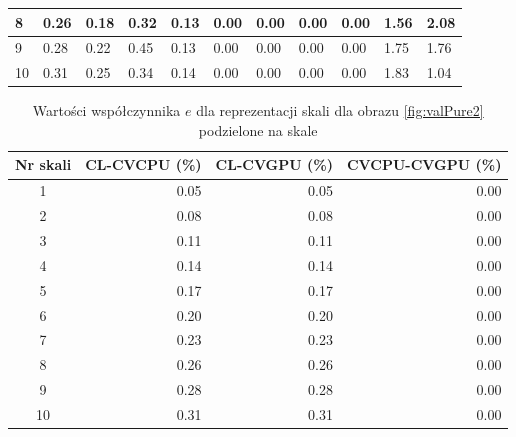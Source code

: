 {\begin{landscape}
\begin{table}[h]
\begin{tabular}{|p{0.8cm}|p{2cm}|p{2cm}|p{2cm}|p{2cm}|p{2cm}|p{2cm}|p{2cm}|p{2cm}|p{2cm}|p{2cm}|}
8        & 0.26                          & 0.18                           & 0.32              & 0.13             & 0.00                & 0.00                 & 0.00                  & 0.00                   & 1.56              & 2.08             \\ \hline
9        & 0.28                          & 0.22                           & 0.45              & 0.13             & 0.00                & 0.00                 & 0.00                  & 0.00                   & 1.75              & 1.76             \\ \hline
10       & 0.31                          & 0.25                           & 0.34              & 0.14             & 0.00                & 0.00                 & 0.00                  & 0.00                   & 1.83              & 1.04             \\ \hline
\end{tabular}
\end{table}
\end{landscape}}

\begin{center}
\begin{table}
\centering
\caption{Wartości współczynnika $ e $ dla reprezentacji skali dla obrazu \ref{fig:valPure2} podzielone na skale}
\label{tab:imageScaleRep2}
\begin{tabular}{|c|r|r|r|}
 \hline
Nr skali & CL-CVCPU (\%) & CL-CVGPU (\%) & CVCPU-CVGPU (\%) \\ \hline
1        & 0.05     & 0.05     & 0.00        \\ \hline
2        & 0.08     & 0.08     & 0.00        \\ \hline
3        & 0.11     & 0.11     & 0.00        \\ \hline
4        & 0.14     & 0.14     & 0.00        \\ \hline
5        & 0.17     & 0.17     & 0.00        \\ \hline
6        & 0.20     & 0.20     & 0.00        \\ \hline
7        & 0.23     & 0.23     & 0.00        \\ \hline
8        & 0.26     & 0.26     & 0.00        \\ \hline
9        & 0.28     & 0.28     & 0.00        \\ \hline
10       & 0.31     & 0.31     & 0.00        \\ \hline
\end{tabular}
\end{table}
\end{center}

